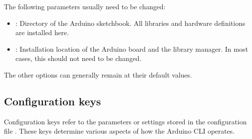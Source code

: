 The following parameters usually need to be changed:
\begin{itemize}
	\item {}: Directory of the Arduino sketchbook. All libraries and hardware definitions are installed here.
	\item {}: Installation location of the Arduino board and the library manager. In most cases, this should not need to be changed.
\end{itemize}
The other options can generally remain at their default values.


\subsection{Configuration keys}

Configuration keys refer to the parameters or settings stored in the configuration file . These keys determine various aspects of how the Arduino CLI operates. \cite{ArduinoCLIConfig:2024}

